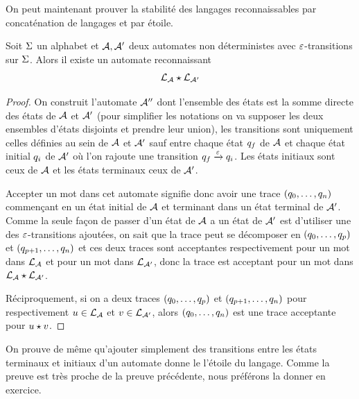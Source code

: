 On peut maintenant prouver la stabilité des langages reconnaissables par
concaténation de langages et par étoile.

\begin{proposition}\label{prop.concat.ratio}
  Soit $\Sigma$ un alphabet et $\mathcal{A}, \mathcal{A}'$ deux automates non déterministes
  avec $\varepsilon$-transitions sur $\Sigma$. Alors il existe un automate reconnaissant
  \[\mathcal L_{\mathcal{A}} \mathbin{\star} \mathcal L_{\mathcal{A}'}\]
\end{proposition}

\begin{proof}
  On construit l'automate $\mathcal{A}''$ dont l'ensemble des états est la somme
  directe des états de $\mathcal{A}$ et $\mathcal{A}'$ (pour simplifier les notations on
  va supposer les deux ensembles d'états disjoints et prendre leur union), les
  transitions sont uniquement celles définies au sein de $\mathcal{A}$ et $\mathcal{A}'$
  sauf entre chaque état $q_{f}$ de $\mathcal{A}$ et chaque état initial
  $q_{i}$ de $\mathcal{A}'$ où l'on rajoute une transition
  $q_{f}\xrightarrow{\varepsilon}q_{i}$. Les états initiaux sont ceux de
  $\mathcal{A}$ et les états terminaux ceux de $\mathcal{A}'$.

  Accepter un mot dans cet automate signifie donc avoir une trace
  $(q_{0},\ldots,q_{n})$ commençant en un état initial de $\mathcal{A}$ et
  terminant dans un état terminal de $\mathcal{A}'$. Comme la seule façon de passer
  d'un état de $\mathcal{A}$ a un état de $\mathcal{A}'$ est d'utiliser une des
  $\varepsilon$-transitions ajoutées, on sait que la trace peut se décomposer en
  $(q_{0},\ldots,q_{p})$ et $(q_{{p+1}},\ldots,q_{n})$ et ces deux
  traces sont acceptantes respectivement pour un mot dans $\mathcal L_{\mathcal{A}}$ et
  pour un mot dans $\mathcal L_{\mathcal{A}'}$, donc la trace est acceptant pour un mot
  dans $\mathcal L_{\mathcal{A}} \mathbin{\star} \mathcal L_{\mathcal{A}'}$.

  Réciproquement, si on a deux traces $(q_{0},\ldots,q_{p})$ et
  $(q_{p+1},\ldots,q_{n})$ pour respectivement
  $u \in \mathcal L_{\mathcal{A}}$ et $v\in\mathcal L_{\mathcal{A}'}$, alors
  $(q_{0},\ldots,q_{n})$ est une trace acceptante pour $u\mathbin{\star}v$.
\end{proof}

On prouve de même qu'ajouter simplement des transitions entre les états
terminaux et initiaux d'un automate donne le l'étoile du langage. Comme la
preuve est très proche de la preuve précédente, nous préférons la donner en
exercice.

